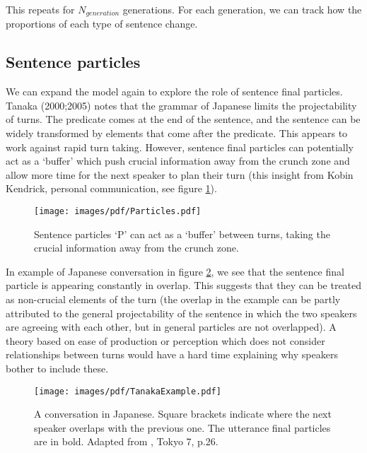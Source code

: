 \documentclass[12pt]{article}
\begin{document}
This repeats for $N_{generation}$ generations.  For each generation, we can track how the proportions of each type of sentence change.

\subsection{Sentence particles}

We can expand the model again to explore the role of sentence final particles.  
Tanaka (2000;2005)\nocite{tanaka2000turn,tanaka2005grammar} notes that the grammar of Japanese limits the projectability of turns.   The predicate comes at the end of the sentence, and the sentence can be widely transformed by elements that come after the predicate.  This appears to work against rapid turn taking.  However, sentence final particles can potentially act as a `buffer' which push crucial information away from the crunch zone and allow more time for the next speaker to plan their turn (this insight from Kobin Kendrick, personal communication, see figure \ref{fig:Particles}).  

\begin{figure}[htbp]
\begin{center}
\texttt{[image: images/pdf/Particles.pdf]}
\caption{Sentence particles `P' can act as a `buffer' between turns, taking the crucial information away from the crunch zone.}
\label{fig:Particles}
\end{center}
\end{figure}


In example of Japanese conversation in figure \ref{fig:Tanaka}, we see that the sentence final particle is appearing constantly in overlap.  This suggests that they can be treated as non-crucial elements of the turn (the overlap in the example can be partly attributed to the general projectability of the sentence in which the two speakers are agreeing with each other, but in general particles are not overlapped).  A theory based on ease of production or perception which does not consider relationships between turns would have a hard time explaining why speakers bother to include these.  

\begin{figure}[htbp]
\begin{center}
\texttt{[image: images/pdf/TanakaExample.pdf]}
\caption{A conversation in Japanese.  Square brackets indicate where the next speaker overlaps with the previous one.  The utterance final particles are in bold. Adapted from \cite{tanaka2000turn}, Tokyo 7, p.26.}
\label{fig:Tanaka}
\end{center}
\end{figure}
\end{document}
